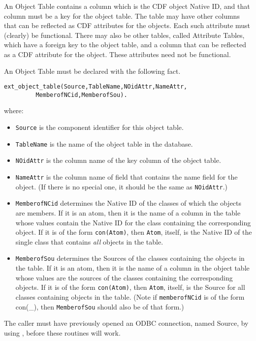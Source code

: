 An Object Table contains a column which is the CDF object Native ID,
and that column must be a key for the object table.  The table may
have other columns that can be reflected as CDF attributes for the
objects.  Each such attribute must (clearly) be functional.  There may
also be other tables, called Attribute Tables, which have a foreign
key to the object table, and a column that can be reflected as a CDF
attribute for the object.  These attributes need not be functional.

An Object Table must be declared with the following fact.

\begin{verbatim}
ext_object_table(Source,TableName,NOidAttr,NameAttr,
		 MemberofNCid,MemberofSou).
\end{verbatim}

where:

\begin{itemize}
\item
{\tt Source} is the component identifier for this object table.
\item
{\tt TableName} is the name of the object table in the database.
\item
{\tt NOidAttr} is the column name of the key column of the object table.
\item
{\tt NameAttr} is the column name of field that contains the name field
  for the object.  (If there is no special one, it should be the same
  as {\tt NOidAttr}.)
\item
{\tt MemberofNCid} determines the Native ID of the classes of which the
objects are members.  If it is an atom, then it is the name of a
column in the table whose values contain the Native ID for the class
containing the corresponding object.  If it is of the form
{\tt con(Atom)}, then {\tt Atom}, itself, is the Native ID of the single
class that contains {\em all} objects in the table.
\item
{\tt MemberofSou} determines the Sources of the classes containing the
objects in the table.  If it is an atom, then it is the name of a
column in the object table whose values are the sources of the classes
containing the corresponding objects.  If it is of the form
{\tt con(Atom)}, then {\tt Atom}, itself, is the Source for all classes
containing objects in the table.  (Note if {\tt memberofNCid} is of the
form con(\_), then {\tt MemberofSou} should also be of that form.)
\end{itemize}

The caller must have previously opened an ODBC connection, named
Source, by using , before these routines will work.


